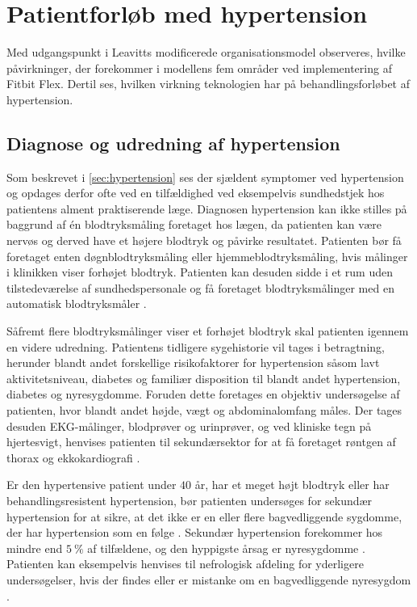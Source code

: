 \section{Patientforløb med hypertension}
Med udgangspunkt i Leavitts modificerede organisationsmodel observeres, hvilke påvirkninger, der forekommer i modellens fem områder ved implementering af Fitbit Flex. Dertil ses, hvilken virkning teknologien har på behandlingsforløbet af hypertension.

\subsection{Diagnose og udredning af hypertension} \label{sec:dia_hypertension}
Som beskrevet i \autoref{sec:hypertension} ses der sjældent symptomer ved hypertension og opdages derfor ofte ved en tilfældighed ved eksempelvis sundhedstjek hos patientens alment praktiserende læge. 
Diagnosen hypertension kan ikke stilles på baggrund af én blodtryksmåling foretaget hos lægen, da patienten kan være nervøs og derved have et højere blodtryk og påvirke resultatet. Patienten bør få foretaget enten døgnblodtryksmåling eller hjemmeblodtryksmåling, hvis målinger i klinikken viser forhøjet blodtryk. Patienten kan desuden sidde i et rum uden tilstedeværelse af sundhedspersonale og få foretaget blodtryksmålinger med en automatisk blodtryksmåler \citep{lodberg2016, bech2015}.

Såfremt flere blodtryksmålinger viser et forhøjet blodtryk skal patienten igennem en videre udredning. Patientens tidligere sygehistorie vil tages i betragtning, herunder blandt andet forskellige risikofaktorer for hypertension såsom lavt aktivitetsniveau, diabetes og familiær disposition til blandt andet hypertension, diabetes og nyresygdomme. Foruden dette foretages en objektiv undersøgelse af patienten, hvor blandt andet højde, vægt og abdominalomfang måles. Der tages desuden EKG-målinger, blodprøver og urinprøver, og ved kliniske tegn på hjertesvigt, henvises patienten til sekundærsektor for at få foretaget røntgen af thorax og ekkokardiografi \citep{lodberg2016, bech2015}.

Er den hypertensive patient under $40$ år, har et meget højt blodtryk eller har behandlingsresistent hypertension, bør patienten undersøges for sekundær hypertension for at sikre, at det ikke er en eller flere bagvedliggende sygdomme, der har hypertension som en følge \citep{lodberg2016}. Sekundær hypertension forekommer hos mindre end $5~\%$ af tilfældene, og den hyppigste årsag er nyresygdomme \citep{lodberg2008}. Patienten kan eksempelvis henvises til nefrologisk afdeling for yderligere undersøgelser, hvis der findes eller er mistanke om en bagvedliggende nyresygdom \citep{lodberg2016, sundhedsstyrelsen2010}. 

